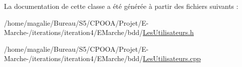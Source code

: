 La documentation de cette classe a été générée à partir des fichiers suivants \-:\begin{DoxyCompactItemize}
\item 
/home/magalie/\-Bureau/\-S5/\-C\-P\-O\-O\-A/\-Projet/\-E-\/\-Marche-\//iterations/iteration4/\-E\-Marche/bdd/\hyperlink{_les_utilisateurs_8h}{Les\-Utilisateurs.\-h}\item 
/home/magalie/\-Bureau/\-S5/\-C\-P\-O\-O\-A/\-Projet/\-E-\/\-Marche-\//iterations/iteration4/\-E\-Marche/bdd/\hyperlink{_les_utilisateurs_8cpp}{Les\-Utilisateurs.\-cpp}\end{DoxyCompactItemize}
